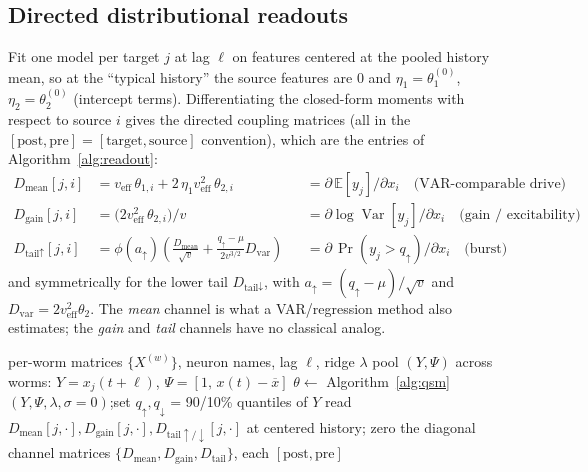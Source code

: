 \documentclass[11pt]{article}
\newcommand{\Var}{\operatorname{Var}}
\newcommand{\E}{\mathbb{E}}
\begin{document}
\subsection{Directed distributional readouts}
Fit one model per target $j$ at lag $\ell$ on features centered at the pooled history mean, so at the
``typical history'' the source features are $0$ and $\eta_1=\theta_1^{(0)}$, $\eta_2=\theta_2^{(0)}$
(intercept terms). Differentiating the closed-form moments with respect to source $i$ gives the
directed coupling matrices (all in the $[\text{post},\text{pre}]=[\text{target},\text{source}]$
convention), which are the entries of Algorithm~\ref{alg:readout}:
\[
\begin{aligned}
D_{\text{mean}}[j,i] &= v_{\mathrm{eff}}\,\theta_{1,i} + 2\,\eta_1 v_{\mathrm{eff}}^2\,\theta_{2,i}
   &&= \partial\,\E[y_j]/\partial x_i \quad\text{(VAR-comparable drive)}\\
D_{\text{gain}}[j,i] &= \bigl(2 v_{\mathrm{eff}}^2\,\theta_{2,i}\bigr)/v
   &&= \partial\log\Var[y_j]/\partial x_i \quad\text{(gain / excitability)}\\
D_{\text{tail}\uparrow}[j,i] &= \phi(a_{\uparrow})\!\left(\tfrac{D_{\text{mean}}}{\sqrt v}
   + \tfrac{q_{\uparrow}-\mu}{2 v^{3/2}} D_{\text{var}}\right)
   &&= \partial\,\Pr(y_j>q_{\uparrow})/\partial x_i \quad\text{(burst)}
\end{aligned}
\]
and symmetrically for the lower tail $D_{\text{tail}\downarrow}$, with
$a_{\uparrow}=(q_{\uparrow}-\mu)/\sqrt v$ and $D_{\text{var}}=2v_{\mathrm{eff}}^2\theta_{2}$. The
\emph{mean} channel is what a VAR/regression method also estimates; the \emph{gain} and \emph{tail}
channels have no classical analog.

\begin{algorithm}[t]
\caption{Distributional functional connectome at lag $\ell$}
\label{alg:readout}
\begin{algorithmic}[1]
\Require per-worm matrices $\{X^{(w)}\}$, neuron names, lag $\ell$, ridge $\lambda$
  \State pool $(Y,\Psi)$ across worms: $Y=x_j(t{+}\ell)$, $\Psi=[1,\,x(t)-\overline{x}]$ 
  \State $\theta \gets$ Algorithm~\ref{alg:qsm}$(Y,\Psi,\lambda,\sigma{=}0)$;\quad set $q_\uparrow,q_\downarrow$ = 90/10\% quantiles of $Y$
  \State read $D_{\text{mean}}[j,\cdot],D_{\text{gain}}[j,\cdot],D_{\text{tail}\uparrow/\downarrow}[j,\cdot]$ at centered history; zero the diagonal
\EndFor
\State \Return channel matrices $\{D_{\text{mean}},D_{\text{gain}},D_{\text{tail}}\}$, each $[\text{post},\text{pre}]$
\end{algorithmic}
\end{algorithm}
\end{document}

